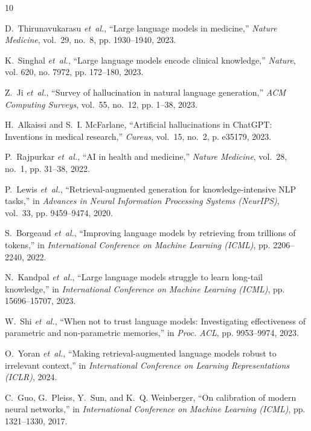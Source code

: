 \documentclass[journal,10pt]{IEEEtran}
\begin{document}

\begin{thebibliography}{10}

D.~Thirunavukarasu \emph{et~al.}, ``Large language models in medicine,'' \emph{Nature Medicine}, vol.~29, no.~8, pp. 1930--1940, 2023.

K.~Singhal \emph{et~al.}, ``Large language models encode clinical knowledge,'' \emph{Nature}, vol. 620, no. 7972, pp. 172--180, 2023.

Z.~Ji \emph{et~al.}, ``Survey of hallucination in natural language generation,'' \emph{ACM Computing Surveys}, vol.~55, no.~12, pp. 1--38, 2023.

H.~Alkaissi and S.~I. McFarlane, ``Artificial hallucinations in ChatGPT: Inventions in medical research,'' \emph{Cureus}, vol.~15, no.~2, p. e35179, 2023.

P.~Rajpurkar \emph{et~al.}, ``AI in health and medicine,'' \emph{Nature Medicine}, vol.~28, no.~1, pp. 31--38, 2022.

P.~Lewis \emph{et~al.}, ``Retrieval-augmented generation for knowledge-intensive NLP tasks,'' in \emph{Advances in Neural Information Processing Systems (NeurIPS)}, vol.~33, pp. 9459--9474, 2020.

S.~Borgeaud \emph{et~al.}, ``Improving language models by retrieving from trillions of tokens,'' in \emph{International Conference on Machine Learning (ICML)}, pp. 2206--2240, 2022.

N.~Kandpal \emph{et~al.}, ``Large language models struggle to learn long-tail knowledge,'' in \emph{International Conference on Machine Learning (ICML)}, pp. 15696--15707, 2023.

W.~Shi \emph{et~al.}, ``When not to trust language models: Investigating effectiveness of parametric and non-parametric memories,'' in \emph{Proc. ACL}, pp. 9953--9974, 2023.

O.~Yoran \emph{et~al.}, ``Making retrieval-augmented language models robust to irrelevant context,'' in \emph{International Conference on Learning Representations (ICLR)}, 2024.

C.~Guo, G.~Pleiss, Y.~Sun, and K.~Q. Weinberger, ``On calibration of modern neural networks,'' in \emph{International Conference on Machine Learning (ICML)}, pp. 1321--1330, 2017.


\end{thebibliography}
\end{document}
